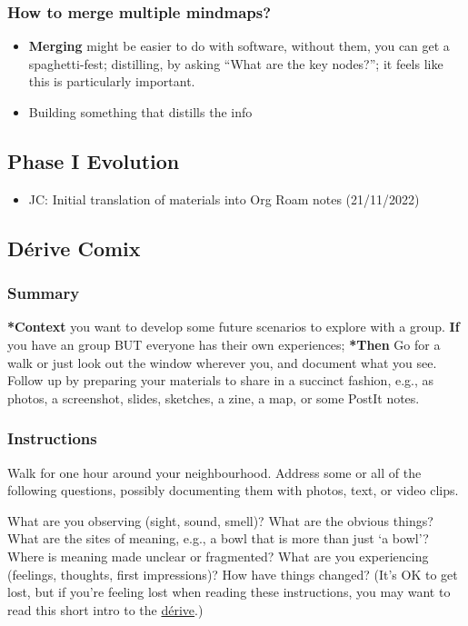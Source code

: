 \documentclass{article}
\begin{document}
\subsubsection{How to merge multiple mindmaps?}
\begin{itemize}
\item \textbf{Merging} might be easier to do with software, without them, you can get a spaghetti-fest; distilling, by asking ``What are the key nodes?''; it feels like this is particularly important.
\item Building something that distills the info
\end{itemize}

\subsection{Phase I Evolution}

\begin{itemize}
\item JC: Initial translation of materials into Org Roam notes (21/11/2022)
\end{itemize}
\subsection{Dérive Comix}
\label{615846a2-1795-40b4-8dfb-3e12923fccc0}
\subsubsection{Summary}

\textbf{*Context} you want to develop some future scenarios to explore with a
group. \textbf{If} you have an group BUT everyone has their own experiences;
\textbf{*Then} Go for a walk or just look out the window wherever you, and
document what you see. Follow up by preparing your materials to share in
a succinct fashion, e.g., as photos, a screenshot, slides, sketches, a
zine, a map, or some PostIt notes.

\subsubsection{Instructions}

Walk for one hour around your neighbourhood.  Address some or all of
the following questions, possibly documenting them with photos, text,
or video clips.

What are you observing (sight, sound, smell)?  What are the obvious
things?  What are the sites of meaning, e.g., a bowl that is more than
just ‘a bowl’?  Where is meaning made unclear or fragmented?  What are
you experiencing (feelings, thoughts, first impressions)?  How have
things changed?  (It’s OK to get lost, but if you’re feeling lost when
reading these instructions, you may want to read this short intro to
the \href{https://www.publicstreet.org/derive}{dérive}.)
\end{document}

